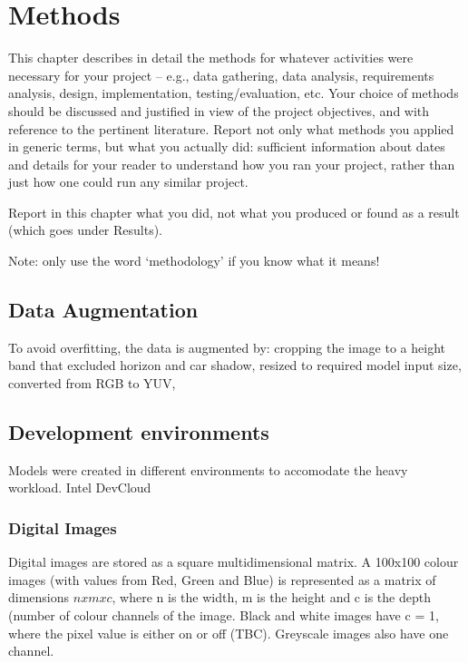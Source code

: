 
\chapter{Methods}

\label{Methods} 

This chapter describes in detail the methods for whatever activities were necessary for your project – e.g., data gathering, data analysis, requirements analysis, design, implementation, testing/evaluation, etc. Your choice of methods should be discussed and justified in view of the project objectives, and with reference to the pertinent literature. Report not only what methods you applied in generic terms, but what you actually did: sufficient information about dates and details for your reader to understand how you ran your project, rather than just how one could run any similar project.  

Report in this chapter what you did, not what you produced or found as a 
result (which goes under Results).  
  
Note: only use the word ‘methodology’ if you know what it means!  


\section{Data Augmentation}
To avoid overfitting, the data is augmented by: cropping the image to a height band that excluded horizon and car shadow, resized to required model input size, converted from RGB to YUV, 


\section{Development environments}

Models were created in different environments to accomodate the heavy workload. Intel DevCloud 

\subsection{Digital Images}
Digital images are stored as a square multidimensional matrix. A 100x100 colour images (with values from Red, Green and Blue) is represented as a matrix of dimensions $n x m x c$, where n is the width, m is the height and c is the depth (number of colour channels of the image. Black and white images have c = 1, where the pixel value is either on or off (TBC). Greyscale images also have one channel.


